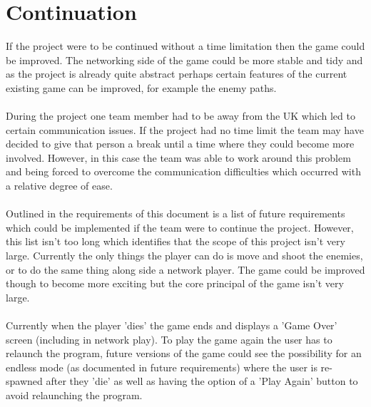 \section{Continuation}
\label{sec: continuation}
If the project were to be continued without a time limitation then the game could be improved. The networking side of the game could be more stable and tidy and as the project is already quite abstract perhaps certain features of the current existing game can be improved, for example the enemy paths.\\\\
During the project one team member had to be away from the UK which led to certain communication issues. If the project had no time limit the team may have decided to give that person a break until a time where they could become more involved. However, in this case the team was able to work around this problem and being forced to overcome the communication difficulties which occurred with a relative degree of ease.\\\\
Outlined in the requirements of this document is a list of future requirements which could be implemented if the team were to continue the project. However, this list isn't too long which identifies that the scope of this project isn't very large. Currently the only things the player can do is move and shoot the enemies, or to do the same thing along side a network player. The game could be improved though to become more exciting but the core principal of the game isn't very large.\\\\
Currently when the player 'dies' the game ends and displays a 'Game Over' screen (including in network play). To play the game again the user has to relaunch the program, future versions of the game could see the possibility for an endless mode (as documented in future requirements) where the user is re-spawned after they 'die' as well as having the option of a 'Play Again' button to avoid relaunching the program.
